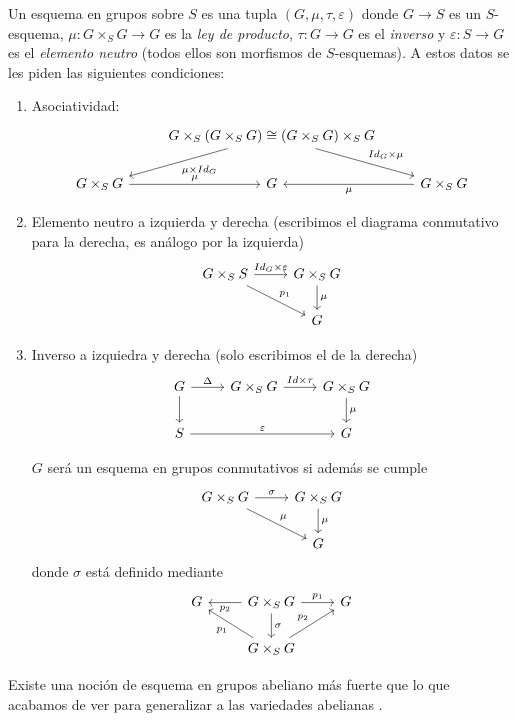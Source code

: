 \documentclass[GA.tex]{subfiles}
\begin{document}
\begin{defi}
Un esquema en grupos sobre $S$ es una tupla $(G,\mu,\tau,\varepsilon)$ donde $G\to S$ es un $S$-esquema, $\mu:G\times_SG\to G$ es la \emph{ley de producto}, $\tau:G\to G$ es el \emph{inverso} y $\varepsilon:S\to G$ es el \emph{elemento neutro} (todos ellos son morfismos de $S$-esquemas). A estos datos se les piden las siguientes condiciones:
\begin{enumerate}
\item Asociatividad:
\[
\begin{tikzcd}
& G\times_S(G\times_S G)\cong (G\times_SG)\times_S G\arrow[rd, "Id_G\times\mu"]\arrow[ld, "\mu\times Id_G"] &\\
G\times_S G \arrow[r, "\mu"] & G & G\times_SG\arrow[l, "\mu"]
\end{tikzcd}
\]
\item Elemento neutro a izquierda y derecha (escribimos el diagrama conmutativo para la derecha, es análogo por la izquierda)
\[
\begin{tikzcd}
G\times_S S \arrow[r, "Id_G\times\varepsilon"]\arrow[dr, "p_1"] & G\times_S G\arrow[d, "\mu"]\\
& G
\end{tikzcd}
\]
\item Inverso a izquiedra y derecha (solo escribimos el de la derecha) 
\[
\begin{tikzcd}
G\arrow[r, "\Delta"]\arrow[d] & G\times_S G\arrow[r, "Id\times \tau"] & G\times_S G\arrow[d, "\mu"]\\
S\arrow[rr, "\varepsilon"] & & G
\end{tikzcd}
\]

$G$ será un esquema en grupos conmutativos si además se cumple
\[
\begin{tikzcd}
G\times_S G\arrow[r, "\sigma"] \arrow[dr, "\mu"] & G\times_SG\arrow[d, "\mu"]\\
& G
\end{tikzcd}
\]
donde $\sigma$ está definido mediante
\[
\begin{tikzcd}
G & G\times_SG\arrow[l, "p_2"]\arrow[r, "p_1"]\arrow[d, "\sigma"] & G\\
& G\times_S G\arrow[ul, "p_1"]\arrow[ur, "p_2"] & 
\end{tikzcd}
\]
\end{enumerate}

Existe una noción de esquema en grupos abeliano más fuerte que lo que acabamos de ver para generalizar a las variedades abelianas .
\end{defi}
\end{document}
